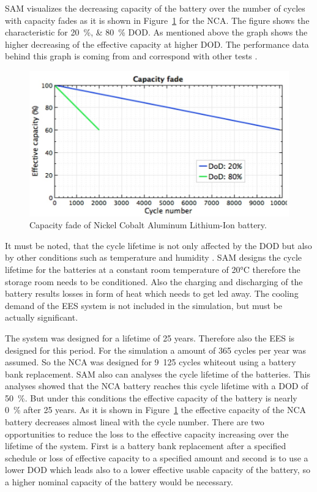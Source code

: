 SAM visualizes the decreasing capacity of the battery over the number of cycles with capacity fades as it is shown in Figure~\ref{CapacityFade} for the NCA. The figure shows the characteristic for \SIlist{20;80}{\percent} DOD. As mentioned above the graph shows the higher decreasing of the effective capacity at higher DOD. The performance data behind this graph is coming from \cite{Dahn2011} and correspond with other tests \cite{Read2009}.
\begin{figure}[bhtp]  
\centering
\includegraphics[width=0.75\linewidth]{FIG/CapacityFade}
\caption[Capacity fade of Nickel Cobalt Aluminum Lithium-Ion battery.]{Capacity fade of Nickel Cobalt Aluminum Lithium-Ion battery.}\label{CapacityFade}
\end{figure}

It must be noted, that the cycle lifetime is not only affected by the DOD but also by other conditions such as temperature and humidity \cite{MitElectricVehilceTeam2008}. SAM designs the cycle lifetime for the batteries at a constant room temperature of 20\si{\celsius} therefore the storage room needs to be conditioned. Also the charging and discharging of the battery results losses in form of heat which needs to get led away. The cooling demand of the EES system is not included in the simulation, but must be actually significant. \cite{Diorio2015} 



The system was designed for a lifetime of 25 years. Therefore also the EES is designed for this period. For the simulation a amount of 365 cycles per year was assumed. So the NCA was designed for 9~125 cycles whiteout using a battery bank replacement. SAM also can analyses the cycle lifetime of the batteries. This analyses showed that the NCA battery reaches this cycle lifetime with a DOD of 50~\%. But under this conditions the effective capacity of the battery is nearly 0~\% after 25 years. As it is shown in Figure~\ref{CapacityFade} the effective capacity of the NCA battery decreases almost lineal with the cycle number. There are two opportunities to reduce the loss to the effective capacity increasing over the lifetime of the system. First is a battery bank replacement after a specified schedule or loss of effective capacity to a specified amount and second is to use a lower DOD which leads also to a lower effective usable capacity of the battery, so a higher nominal capacity of the battery would be necessary.



